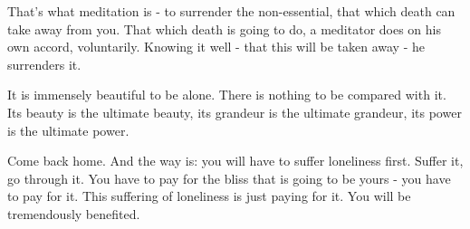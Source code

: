 That's what meditation is - to surrender the non-essential, that which death can take away from you. That which death is going to do, a meditator does on his own accord, voluntarily. Knowing it well - that this will be taken away - he surrenders it.

It is immensely beautiful to be alone. There is nothing to be compared with it. Its beauty is the ultimate beauty, its grandeur is the ultimate grandeur, its power is the ultimate power.

Come back home. And the way is: you will have to suffer loneliness first. Suffer it, go through it. You have to pay for the bliss that is going to be yours - you have to pay for it. This suffering of loneliness is just paying for it. You will be tremendously benefited.
